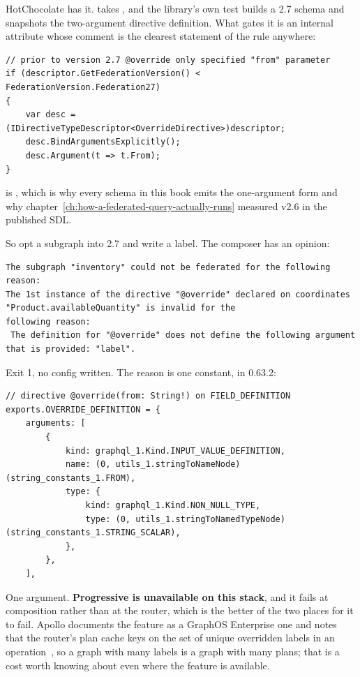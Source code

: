 HotChocolate has it.  takes
, and the library's own test builds a
2.7 schema and snapshots the two-argument directive definition. What gates it is
an internal attribute whose comment is the clearest statement of the rule
anywhere:

\begin{verbatim}
// prior to version 2.7 @override only specified "from" parameter
if (descriptor.GetFederationVersion() < FederationVersion.Federation27)
{
    var desc = (IDirectiveTypeDescriptor<OverrideDirective>)descriptor;
    desc.BindArgumentsExplicitly();
    desc.Argument(t => t.From);
}
\end{verbatim}

 is , which is why every
schema in this book emits the one-argument form and why
chapter~\ref{ch:how-a-federated-query-actually-runs} measured v2.6 in the
published SDL.

So opt a subgraph into 2.7 and write a label. The composer has an opinion:

\begin{verbatim}
The subgraph "inventory" could not be federated for the following reason:
The 1st instance of the directive "@override" declared on coordinates "Product.availableQuantity" is invalid for the
following reason:
 The definition for "@override" does not define the following argument that is provided: "label".
\end{verbatim}

%
Exit 1, no config written. The reason is one constant, in
 0.63.2:

\begin{verbatim}
// directive @override(from: String!) on FIELD_DEFINITION
exports.OVERRIDE_DEFINITION = {
    arguments: [
        {
            kind: graphql_1.Kind.INPUT_VALUE_DEFINITION,
            name: (0, utils_1.stringToNameNode)(string_constants_1.FROM),
            type: {
                kind: graphql_1.Kind.NON_NULL_TYPE,
                type: (0, utils_1.stringToNamedTypeNode)(string_constants_1.STRING_SCALAR),
            },
        },
    ],
\end{verbatim}

One argument. \textbf{Progressive  is unavailable on this
stack}, and
it fails at composition rather than at the router, which is the better of the
two places for it to fail. Apollo documents the feature as a GraphOS Enterprise
one and notes that the router's plan cache keys on the set of unique overridden
labels in an operation~\autocite{apollo2026migratefields}, so a graph with many
labels is a graph with many plans; that is a cost worth knowing about even where
the feature is available.

